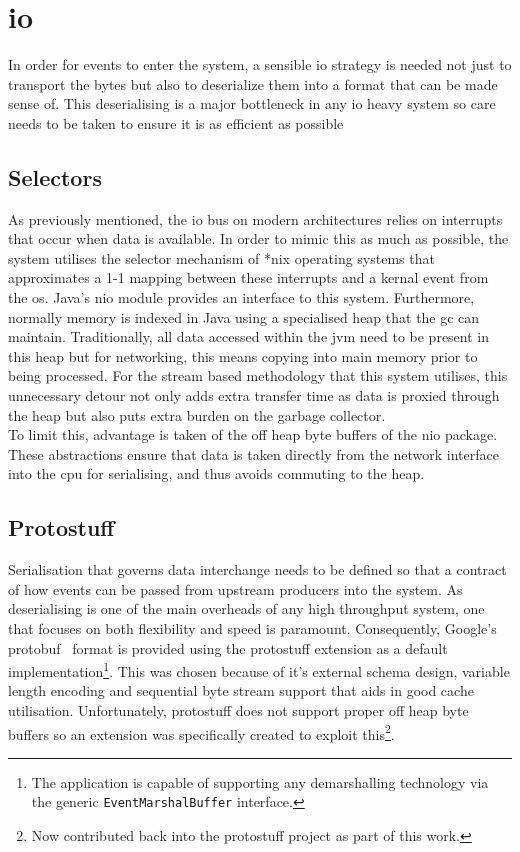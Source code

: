 \documentclass[a4paper,11pt]{scrreprt}
\begin{document}
\section{\acrshort{io}}
In order for events to enter the system, a sensible \acrshort{io} strategy is needed not just to transport the bytes but also to deserialize them into a format that can be made sense of. This deserialising is a major bottleneck in any \acrshort{io} heavy system so care needs to be taken to ensure it is as efficient as possible
\subsection{Selectors}
As previously mentioned, the \acrshort{io} bus on modern architectures relies on interrupts that occur when data is available. In order to mimic this as much as possible, the system utilises the selector mechanism of *nix operating systems that approximates a 1-1 mapping between these interrupts and a kernal event from the \acrshort{os}. Java's \acrshort{nio} module provides an interface to this system. Furthermore, normally memory is indexed in Java using a specialised heap that the \acrshort{gc} can maintain. Traditionally, all data accessed within the \acrshort{jvm} need to be present in this heap but for networking, this means copying into main memory prior to being processed. For the stream based methodology that this system utilises, this unnecessary detour not only adds extra transfer time as data is proxied through the heap but also puts extra burden on the garbage collector.\\
To limit this, advantage is taken of the off heap byte buffers of the \acrshort{nio} package. These abstractions ensure that data is taken directly from the network interface into the \acrshort{cpu} for serialising, and thus avoids commuting to the heap.
\subsection{Protostuff}
Serialisation that governs data interchange needs to be defined so that a contract of how events can be passed from upstream producers into the system. As deserialising is one of the main overheads of any high throughput system, one that focuses on both flexibility and speed is paramount. Consequently, Google's protobuf~\cite{googleprotobuf} format is provided using the protostuff extension as a default implementation\footnote{The application is capable of supporting any demarshalling technology via the generic \texttt{EventMarshalBuffer} interface.}. This was chosen because of it's external schema design, variable length encoding and sequential byte stream support that aids in good cache utilisation. Unfortunately, protostuff does not support proper off heap byte buffers so an extension was specifically created to exploit this\footnote{Now contributed back into the protostuff project as part of this work.}.
\end{document}
